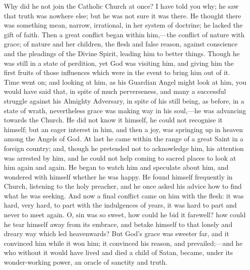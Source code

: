 Why did he not join the Catholic Church at once? I have told you
why; he saw that truth was nowhere else; but he was not sure it was
there. He thought there was something mean, narrow, irrational, in her
system of doctrine; he lacked the gift of faith. Then a great conflict
began within him,—the conflict of nature with grace; of nature and
her children, the flesh and false reason, against conscience and the
pleadings of the Divine Spirit, leading him to better things. Though
he was still in a state of perdition, yet God was visiting him, and
giving him the first fruits of those influences which were in the
event to bring him out of it. Time went on; and looking at him, as his
Guardian Angel might look at him, you would have said that, in spite
of much perverseness, and many a successful struggle against his
Almighty Adversary, in spite of his still being, as before, in a state
of wrath, nevertheless grace was making way in his soul,—he was
advancing towards the Church. He did not know it himself, he could not
recognise it himself; but an eager interest in him, and then a joy,
was springing up in heaven among the Angels of God. At last he came
within the range of a great Saint in a foreign country; and, though he
pretended not to acknowledge him, his attention was arrested by him,
and he could not help coming to sacred places to look at him again and
again. He began to watch him and speculate about him, and wondered
with himself whether he was happy. He found himself frequently in
Church, listening to the holy preacher, and he once asked his advice
how to find what he was seeking. And now a final conflict came on him
with the flesh: it was hard, very hard, to part with the indulgences
of years, it was hard to part and never to meet again. O, sin was so
sweet, how could he bid it farewell? how could he tear himself away
from its embrace, and betake himself to that lonely and dreary way
which led heavenwards? But God's grace was sweeter far, and it
convinced him while it won him; it convinced his reason, and
prevailed;—and he who without it would have lived and died a child
of Satan, became, under its wonder-working power, an oracle of
sanctity and truth.

